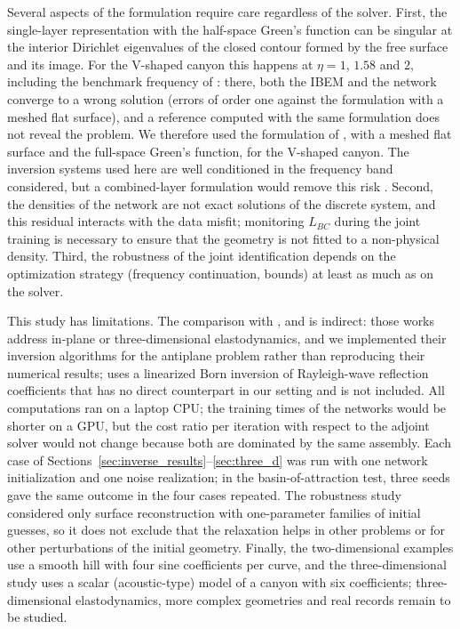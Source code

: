 \documentclass[11pt,twoside]{article}
\begin{document}
Several aspects of the formulation require care regardless of the solver. First, the single-layer representation with the half-space Green's function can be singular at the interior Dirichlet eigenvalues of the closed contour formed by the free surface and its image. For the V-shaped canyon this happens at $\eta=1$, $1.58$ and $2$, including the benchmark frequency of \citet{wu_novel_2026}: there, both the IBEM and the network converge to a wrong solution (errors of order one against the formulation with a meshed flat surface), and a reference computed with the same formulation does not reveal the problem. We therefore used the formulation of \citet{wu_novel_2026}, with a meshed flat surface and the full-space Green's function, for the V-shaped canyon. The inversion systems used here are well conditioned in the frequency band considered, but a combined-layer formulation would remove this risk \citep{Colton2013}. Second, the densities of the network are not exact solutions of the discrete system, and this residual interacts with the data misfit; monitoring $L_{BC}$ during the joint training is necessary to ensure that the geometry is not fitted to a non-physical density. Third, the robustness of the joint identification depends on the optimization strategy (frequency continuation, bounds) at least as much as on the solver.

This study has limitations. The comparison with \citet{Bignardi2012}, \citet{Wang2018} and \citet{Bonnet2009} is indirect: those works address in-plane or three-dimensional elastodynamics, and we implemented their inversion algorithms for the antiplane problem rather than reproducing their numerical results; \citet{Wang2018} uses a linearized Born inversion of Rayleigh-wave reflection coefficients that has no direct counterpart in our setting and is not included. All computations ran on a laptop CPU; the training times of the networks would be shorter on a GPU, but the cost ratio per iteration with respect to the adjoint solver would not change because both are dominated by the same assembly. Each case of Sections~\ref{sec:inverse_results}--\ref{sec:three_d} was run with one network initialization and one noise realization; in the basin-of-attraction test, three seeds gave the same outcome in the four cases repeated. The robustness study considered only surface reconstruction with one-parameter families of initial guesses, so it does not exclude that the relaxation helps in other problems or for other perturbations of the initial geometry. Finally, the two-dimensional examples use a smooth hill with four sine coefficients per curve, and the three-dimensional study uses a scalar (acoustic-type) model of a canyon with six coefficients; three-dimensional elastodynamics, more complex geometries and real records remain to be studied.
\end{document}
